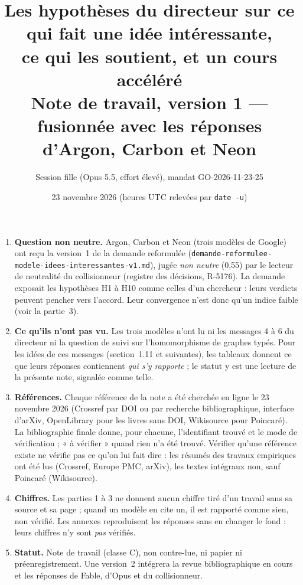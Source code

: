 \documentclass[a4paper,11pt]{article}
\title{Les hypothèses du directeur sur ce qui fait une idée intéressante,\\ ce qui les soutient, et un cours accéléré\\[0.4em]\large Note de travail, version 1 — fusionnée avec les réponses d'Argon, Carbon et Neon}
\author{Session fille (Opus 5.5, effort élevé), mandat GO-2026-11-23-25}
\date{23 novembre 2026 (heures UTC relevées par \texttt{date -u})}
\begin{document}
\maketitle
\thispagestyle{fancy}
\begin{avertissement}
\begin{enumerate}[leftmargin=1.3em,itemsep=2pt]
\item \textbf{Question non neutre.} Argon, Carbon et Neon (trois modèles de Google) ont reçu la version~1 de la demande reformulée (\texttt{demande-reformulee-modele-idees-interessantes-v1.md}), jugée \emph{non neutre} (0,55) par le lecteur de neutralité du collisionneur (registre des décisions, R-5176). La demande exposait les hypothèses H1 à H10 comme celles d'un chercheur : leurs verdicts peuvent pencher vers l'accord. Leur convergence n'est donc qu'un indice faible (voir la partie~3).
\item \textbf{Ce qu'ils n'ont pas vu.} Les trois modèles n'ont lu ni les messages 4 à 6 du directeur ni la question de suivi sur l'homomorphisme de graphes typés. Pour les idées de ces messages (section~1.11 et suivantes), les tableaux donnent ce que leurs réponses contiennent \emph{qui s'y rapporte} ; le statut y est une lecture de la présente note, signalée comme telle.
\item \textbf{Références.} Chaque référence de la note a été cherchée en ligne le 23 novembre 2026 (Crossref par DOI ou par recherche bibliographique, interface d'arXiv, OpenLibrary pour les livres sans DOI, Wikisource pour Poincaré). La bibliographie finale donne, pour chacune, l'identifiant trouvé et le mode de vérification ; « à vérifier » quand rien n'a été trouvé. Vérifier qu'une référence existe ne vérifie pas ce qu'on lui fait dire : les résumés des travaux empiriques ont été lus (Crossref, Europe PMC, arXiv), les textes intégraux non, sauf Poincaré (Wikisource).
\item \textbf{Chiffres.} Les parties 1 à 3 ne donnent aucun chiffre tiré d'un travail sans sa source et sa page ; quand un modèle en cite un, il est rapporté comme sien, non vérifié. Les annexes reproduisent les réponses sans en changer le fond : leurs chiffres n'y sont \emph{pas} vérifiés.
\item \textbf{Statut.} Note de travail (classe C), non contre-lue, ni papier ni préenregistrement. Une version~2 intégrera la revue bibliographique en cours et les réponses de Fable, d'Opus et du collisionneur.
\end{enumerate}
\end{avertissement}
\end{document}
